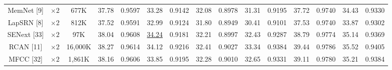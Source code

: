 \documentclass{ieeeaccess}
\begin{document}
\begin{table}
\begin{tabular}{|c|c|c|cc|cc|cc|cc|cc|cc|}
MemNet [9] & $\times 2$&677K& \multicolumn{1}{c|}{37.78} & 0.9597  & \multicolumn{1}{c|}{33.28} &0.9142  &\multicolumn{1}{c|}{32.08} & 0.8978 & \multicolumn{1}{c|}{31.31} &0.9195  & \multicolumn{1}{c|}{37.72} &0.9740
&\multicolumn{1}{c|}{34.43} &0.9330\\

LapSRN [8] & $\times 2$&812K& \multicolumn{1}{c|}{37.52} & 0.9591 & \multicolumn{1}{c|}{32.99} & 0.9124 &\multicolumn{1}{c|}{31.80} & 0.8949 & \multicolumn{1}{c|}{30.41} &  0.9101 & \multicolumn{1}{c|}{37.53} &  0.9740
&\multicolumn{1}{c|}{33.87} & 0.9302\\

SENext [33] & $\times 2$ &97K& \multicolumn{1}{c|}{38.04} & {0.9608} & \multicolumn{1}{c|}{\color{blue}\underline{34.24}} &{ 0.9181} & \multicolumn{1}{c|}{32.21} & {0.8997}& \multicolumn{1}{c|}{32.43} &{0.9287}& \multicolumn{1}{c|}{38.79} &{0.9774} &\multicolumn{1}{c|}{35.14} & {0.9369}\\



RCAN [11]& $\times 2$&16,000K& \multicolumn{1}{c|}{38.27} & 0.9614 & \multicolumn{1}{c|}{34.12} & 0.9216 &\multicolumn{1}{c|}{32.41} & 0.9027& \multicolumn{1}{c|}{33.34} & 0.9384 & \multicolumn{1}{c|}{39.44} & 0.9786
&\multicolumn{1}{c|}{35.52} & 0.9405\\


MFCC [32]& $\times 2$&1,861K& \multicolumn{1}{c|}{38.16} & 0.9606 & \multicolumn{1}{c|}{33.85} &0.9195 &\multicolumn{1}{c|}{32.28} & 0.9010& \multicolumn{1}{c|}{32.65} &0.9331 & \multicolumn{1}{c|}{39.11} & 0.9780
&\multicolumn{1}{c|}{35.21} & 0.9384\\



\end{tabular}
\end{table}
\end{document}
